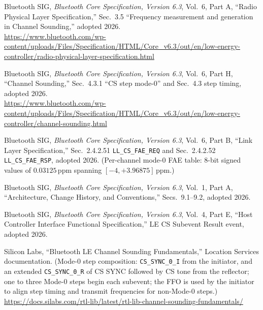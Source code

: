 \documentclass[11pt,a4paper]{article}
\newcommand{\code}[1]{\texttt{\small #1}}
\begin{document}
\begin{enumerate}[label={[\arabic*]},leftmargin=2.2em,itemsep=3pt]
\item Bluetooth SIG, \emph{Bluetooth Core Specification, Version 6.3}, Vol.\ 6, Part A,
  ``Radio Physical Layer Specification,'' Sec.\ 3.5 ``Frequency measurement and generation in
  Channel Sounding,'' adopted 2026.\\
  {\small\url{https://www.bluetooth.com/wp-content/uploads/Files/Specification/HTML/Core_v6.3/out/en/low-energy-controller/radio-physical-layer-specification.html}}

\item Bluetooth SIG, \emph{Bluetooth Core Specification, Version 6.3}, Vol.\ 6, Part H,
  ``Channel Sounding,'' Sec.\ 4.3.1 ``CS step mode-0'' and Sec.\ 4.3 step timing, adopted 2026.\\
  {\small\url{https://www.bluetooth.com/wp-content/uploads/Files/Specification/HTML/Core_v6.3/out/en/low-energy-controller/channel-sounding.html}}

\item Bluetooth SIG, \emph{Bluetooth Core Specification, Version 6.3}, Vol.\ 6, Part B,
  ``Link Layer Specification,'' Sec.\ 2.4.2.51 \code{LL\_CS\_FAE\_REQ} and Sec.\ 2.4.2.52
  \code{LL\_CS\_FAE\_RSP}, adopted 2026. (Per-channel mode-0 FAE table: 8-bit signed values of
  $0.03125$\,ppm spanning $[-4,+3.96875]$\,ppm.)

\item Bluetooth SIG, \emph{Bluetooth Core Specification, Version 6.3}, Vol.\ 1, Part A,
  ``Architecture, Change History, and Conventions,'' Secs.\ 9.1--9.2, adopted 2026.

\item Bluetooth SIG, \emph{Bluetooth Core Specification, Version 6.3}, Vol.\ 4, Part E,
  ``Host Controller Interface Functional Specification,'' LE CS Subevent Result event, adopted 2026.

\item Silicon Labs, ``Bluetooth LE Channel Sounding Fundamentals,'' Location Services
  documentation. (Mode-0 step composition: \code{CS\_SYNC\_0\_I} from the initiator, and an extended
  \code{CS\_SYNC\_0\_R} of CS SYNC followed by CS tone from the reflector; one to three Mode-0 steps
  begin each subevent; the FFO is used by the initiator to align step timing and transmit
  frequencies for non-Mode-0 steps.)\\
  {\small\url{https://docs.silabs.com/rtl-lib/latest/rtl-lib-channel-sounding-fundamentals/}}


\end{enumerate}
\end{document}
